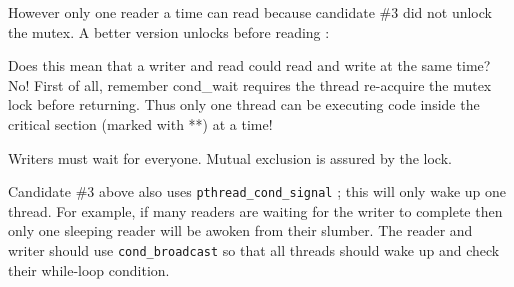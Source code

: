 However only one reader a time can read because candidate \#3 did not
unlock the mutex. A better version unlocks before reading :

\begin{Shaded}
\begin{Highlighting}[]
     
\NormalTok{\}}
\end{Highlighting}
\end{Shaded}

Does this mean that a writer and read could read and write at the same
time? No! First of all, remember cond\_wait requires the thread
re-acquire the mutex lock before returning. Thus only one thread can be
executing code inside the critical section (marked with **) at a time!

\begin{Shaded}
\begin{Highlighting}[]
\NormalTok{**  } 
\NormalTok{\}}
\end{Highlighting}
\end{Shaded}

Writers must wait for everyone. Mutual exclusion is assured by the lock.

\begin{Shaded}
\begin{Highlighting}[]
\NormalTok{**  } 
\NormalTok{**}
\NormalTok{** }
\NormalTok{\}}
\end{Highlighting}
\end{Shaded}

Candidate \#3 above also uses \texttt{pthread\_cond\_signal} ; this will
only wake up one thread. For example, if many readers are waiting for
the writer to complete then only one sleeping reader will be awoken from
their slumber. The reader and writer should use \texttt{cond\_broadcast}
so that all threads should wake up and check their while-loop condition.

